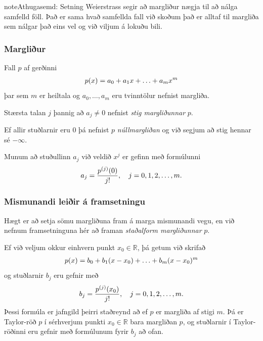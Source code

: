\documentclass[a4paper,10pt,icelandic]{sphinxmanual}
\begin{document}
\begin{notice}{note}{Athugasemd:}
Setning Weierstrass segir að margliður nægja til að nálga samfelld föll.
Það er sama hvað samfellda fall við skoðum það er alltaf til margliða
sem nálgar það eins vel og við viljum á lokuðu bili.
\end{notice}


\subsubsection{Margliður}
\label{kafli03:index-2}\label{kafli03:margliur}
Fall \(p\) af gerðinni
\begin{gather}
\begin{split}p(x) = a_0 + a_1 x + \ldots + a_m x^m\end{split}\notag
\end{gather}
þar sem \(m\) er heiltala og \(a_0, \ldots, a_m\) eru tvinntölur
nefnist margliða.

Stærsta talan \(j\) þannig að \(a_j \not= 0\) nefnist \emph{stig
margliðunnar} \(p\).

Ef allir stuðlarnir eru 0 þá nefnist \(p\) \emph{núllmargliðan} og við
segjum að stig hennar sé \(-\infty\).

Munum að stuðullinn \(a_j\) við veldið \(x^j\) er gefinn með
formúlunni
\begin{gather}
\begin{split}a_j = \frac{p^{(j)}(0)}{j!}, \quad j = 0,1,2,\ldots,m.\end{split}\notag
\end{gather}

\subsubsection{Mismunandi leiðir á framsetningu}
\label{kafli03:index-3}\label{kafli03:mismunandi-leiir-a-framsetningu}
Hægt er að setja sömu margliðuna fram á marga mismunandi vegu, en við
nefnum framsetninguna hér að framan \emph{staðalform margliðunnar} \(p\).

Ef við veljum okkur einhvern punkt \(x_0 \in {{\mathbb  R}}\), þá
getum við skrifað
\begin{gather}
\begin{split}p(x) = b_0 + b_1(x-x_0) + \ldots + b_m(x-x_0)^m\end{split}\notag
\end{gather}
og stuðlarnir \(b_j\) eru gefnir með
\begin{gather}
\begin{split}b_j = \frac{p^{(j)}(x_0)}{j!}, \quad j = 0,1,2,\ldots,m.\end{split}\notag
\end{gather}
Þessi formúla er jafngild þeirri staðreynd að ef \(p\) er margliða
af stigi \(m\). Þá er Taylor-röð \(p\) í sérhverjum punkti
\(x_0 \in {{\mathbb  R}}\) bara margliðan \(p\), og stuðlarnir í
Taylor-röðinni eru gefnir með formúlunum fyrir \(b_j\) að ofan.
\end{document}
